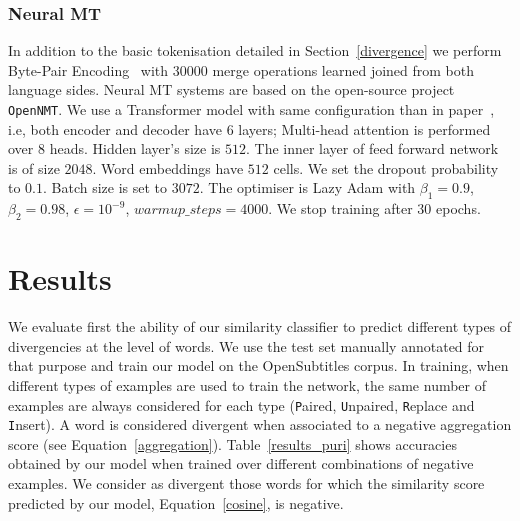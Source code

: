 \documentclass[11pt,a4paper]{article}
\begin{document}
\subsubsection{Neural MT}
\label{translation}

In addition to the basic tokenisation detailed in Section~\ref{divergence} we perform Byte-Pair Encoding~\cite{Sennrich2016} with $30000$ merge operations learned joined from both language sides.
Neural MT systems are based on the open-source project  \texttt{OpenNMT}. 
We use a Transformer model with same configuration than in paper~\cite{vaswani2017attention}, i.e, both encoder and decoder have $6$ layers; Multi-head attention is performed over $8$ heads. 
Hidden layer's size is $512$. 
The inner layer of feed forward network is of size $2048$. 
Word embeddings have $512$ cells. We set the dropout probability to $0.1$. 
Batch size is set to $3072$.
The optimiser is Lazy Adam with $\beta_1 = 0.9$, $\beta_2 = 0.98$, $\epsilon = 10^{-9}$, $warmup\_steps = 4000$. We stop training after $30$ epochs.




\section{Results}
\label{sec:results}

We evaluate first the ability of our similarity classifier to predict different types of divergencies at the level of words. 
We use the test set manually annotated for that purpose and train our model on the OpenSubtitles corpus.
In training, when different types of examples are used to train the network, the same number of examples are always considered for each type ({\texttt P}aired, {\texttt U}npaired, {\texttt R}eplace and {\texttt I}nsert). 
A word is considered divergent when associated to a negative aggregation score (see Equation~\ref{aggregation}).
Table~\ref{results_puri} shows accuracies obtained by our model when trained over different combinations of negative examples.%
We consider as divergent those words for which the similarity score predicted by our model, Equation~\ref{cosine}, is negative.
\end{document}
